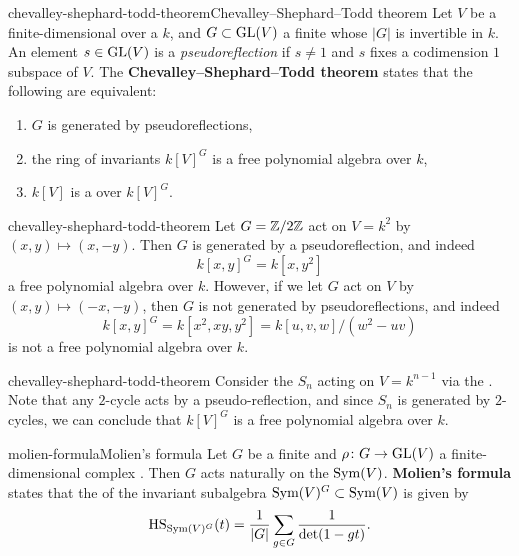 \begin{topic}{chevalley-shephard-todd-theorem}{Chevalley--Shephard--Todd theorem}
    Let $V$ be a finite-dimensional  over a  $k$, and $G \subset \textup{GL}(V)$ a finite  whose  $|G|$ is invertible in $k$. An element $s \in \textup{GL}(V)$ is a \textit{pseudoreflection} if $s \ne 1$ and $s$ fixes a codimension $1$ subspace of $V$. The \textbf{Chevalley--Shephard--Todd theorem} states that the following are equivalent:
    \begin{enumerate}[label=(\roman*)]
        \item $G$ is generated by pseudoreflections,
        \item the ring of invariants $k[V]^G$ is a free polynomial algebra over $k$,
        \item $k[V]$ is a  over $k[V]^G$.
    \end{enumerate}
\end{topic}

\begin{example}{chevalley-shephard-todd-theorem}
    Let $G = \mathbb{Z}/2\mathbb{Z}$ act on $V = k^2$ by $(x, y) \mapsto (x, -y)$. Then $G$ is generated by a pseudoreflection, and indeed
    \[ k[x, y]^G = k[x, y^2] \]
    a free polynomial algebra over $k$. However, if we let $G$ act on $V$ by $(x, y) \mapsto (-x, -y)$, then $G$ is not generated by pseudoreflections, and indeed
    \[ k[x, y]^G = k[x^2, xy, y^2] = k[u, v, w] / (w^2 - uv) \]
    is not a free polynomial algebra over $k$.
\end{example}

\begin{example}{chevalley-shephard-todd-theorem}
    Consider the  $S_n$ acting on $V = k^{n - 1}$ via the . Note that any $2$-cycle acts by a pseudo-reflection, and since $S_n$ is generated by $2$-cycles, we can conclude that $k[V]^G$ is a free polynomial algebra over $k$.
\end{example}

\begin{topic}{molien-formula}{Molien's formula}
    Let $G$ be a finite  and $\rho \colon G \to \textup{GL}(V)$ a finite-dimensional complex . Then $G$ acts naturally on the  $\textup{Sym}(V)$. \textbf{Molien's formula} states that the  of the invariant subalgebra $\textup{Sym}(V)^G \subset \textup{Sym}(V)$ is given by
    \[ \textup{HS}_{\textup{Sym}(V)^G}(t) = \frac{1}{|G|} \sum_{g \in G} \frac{1}{\det(1 - gt)} . \]
\end{topic}


